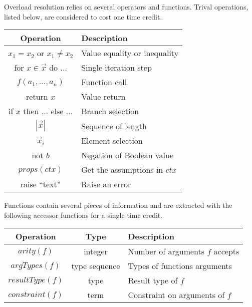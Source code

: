 Overload resolution relies on several operators and functions. Trival operations, listed below, are considered to cost one time credit.
  \begin{center}
  \begin{tabular}{|c|m{7cm}|}
    \hline
      Operation                                  & Description \\
    \hline
      $x_1 = x_2$ or $x_1 \neq x_2$      & Value equality or inequality \\
    \hline
      for $x \in \overrightarrow{x}$ do $\ldots$ & Single iteration step \\
    \hline
      $f(a_1, \ldots, a_n)$                      & Function call \\
    \hline
      return $x$                                 & Value return \\
    \hline
      if $x$ then $\ldots$ else $\ldots$         & Branch selection \\
    \hline
      $|\overrightarrow{x}|$                     & Sequence of length \\
    \hline
      $\overrightarrow{x}_i$                     & Element selection \\
    \hline
      not $b$                                    & Negation of Boolean value \\
    \hline
      $props(ctx)$                            & Get the assumptions in $ctx$\\
    \hline
      raise ``text''                          & Raise an error \\
    \hline
  \end{tabular}
  \end{center}

Functions contain several pieces of information and are extracted with the following accessor functions for a single time credit.
  \begin{center}
    \begin{tabular}{|c|c|l|}
      \hline
        Operation       & Type          & Description \\
      \hline
        $arity(f)$      & integer       & Number of arguments $f$ accepts \\
      \hline
        $argTypes(f)$   & type sequence & Types of functions arguments \\
      \hline
        $resultType(f)$ & type          & Result type of $f$ \\
      \hline
        $constraint(f)$ & term          & Constraint on arguments of $f$ \\
      \hline
    \end{tabular}
  \end{center}



